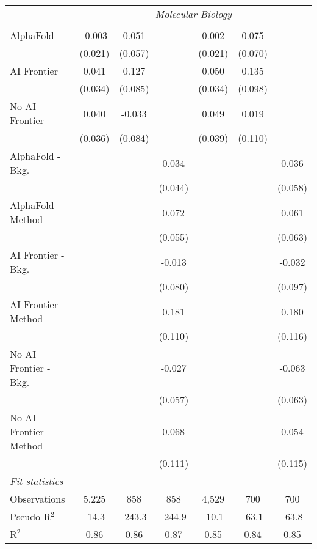\begin{tabular}{lcccccc}
 & \multicolumn{6}{c}{\textit{Molecular Biology}} \\ \\
   AlphaFold               & -0.003  & 0.051   &         & 0.002   & 0.075   &   \\   
                           & (0.021) & (0.057) &         & (0.021) & (0.070) &   \\   
   AI Frontier             & 0.041   & 0.127   &         & 0.050   & 0.135   &   \\   
                           & (0.034) & (0.085) &         & (0.034) & (0.098) &   \\   
   No AI Frontier          & 0.040   & -0.033  &         & 0.049   & 0.019   &   \\   
                           & (0.036) & (0.084) &         & (0.039) & (0.110) &   \\   
   AlphaFold - Bkg.        &         &         & 0.034   &         &         & 0.036\\   
                           &         &         & (0.044) &         &         & (0.058)\\   
   AlphaFold - Method      &         &         & 0.072   &         &         & 0.061\\   
                           &         &         & (0.055) &         &         & (0.063)\\   
   AI Frontier - Bkg.      &         &         & -0.013  &         &         & -0.032\\   
                           &         &         & (0.080) &         &         & (0.097)\\   
   AI Frontier - Method    &         &         & 0.181   &         &         & 0.180\\   
                           &         &         & (0.110) &         &         & (0.116)\\   
   No AI Frontier - Bkg.   &         &         & -0.027  &         &         & -0.063\\   
                           &         &         & (0.057) &         &         & (0.063)\\   
   No AI Frontier - Method &         &         & 0.068   &         &         & 0.054\\   
                           &         &         & (0.111) &         &         & (0.115)\\   
   \midrule
   \emph{Fit statistics}\\
   Observations            & 5,225   & 858     & 858     & 4,529   & 700     & 700\\  
   Pseudo R$^2$            & -14.3   & -243.3  & -244.9  & -10.1   & -63.1   & -63.8\\  
   R$^2$                   & 0.86    & 0.86    & 0.87    & 0.85    & 0.84    & 0.85\\  
   

\end{tabular}

